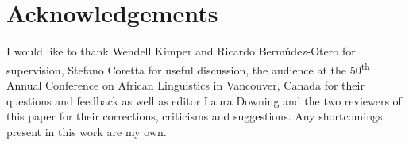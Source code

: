 \documentclass[output=paper]{langscibook}
\begin{document}
\section*{Acknowledgements}

I would like to thank Wendell Kimper and Ricardo Bermúdez-Otero for supervision, Stefano Coretta for useful discussion, the audience at the 50\textsuperscript{th} Annual Conference on African Linguistics in Vancouver, Canada for their questions and feedback as well as editor Laura Downing and the two reviewers of this paper for their corrections, criticisms and suggestions. Any shortcomings present in this work are my own.

{\sloppy\printbibliography[heading=subbibliography,notkeyword=this]}
\end{document}
